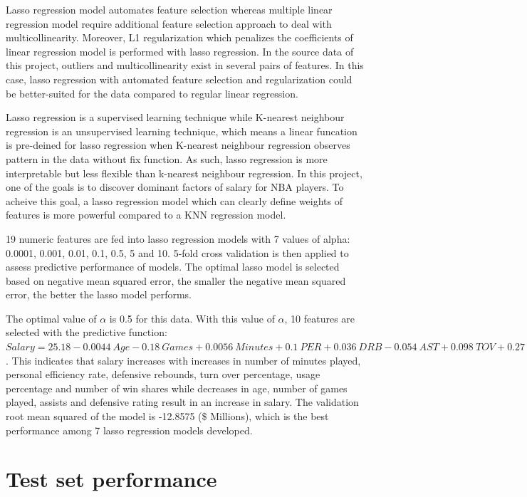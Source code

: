 \documentclass[letterpaper,12pt,twoside,]{pinp}
\begin{document}
Lasso regression model automates feature selection whereas multiple
linear regression model require additional feature selection approach to
deal with multicollinearity. Moreover, L1 regularization which penalizes
the coefficients of linear regression model is performed with lasso
regression. In the source data of this project, outliers and
multicollinearity exist in several pairs of features. In this case,
lasso regression with automated feature selection and regularization
could be better-suited for the data compared to regular linear
regression.

Lasso regression is a supervised learning technique while K-nearest
neighbour regression is an unsupervised learning technique, which means
a linear funcation is pre-deined for lasso regression when K-nearest
neighbour regression observes pattern in the data without fix function.
As such, lasso regression is more interpretable but less flexible than
k-nearest neighbour regression. In this project, one of the goals is to
discover dominant factors of salary for NBA players. To acheive this
goal, a lasso regression model which can clearly define weights of
features is more powerful compared to a KNN regression model.

19 numeric features are fed into lasso regression models with 7 values
of alpha: 0.0001, 0.001, 0.01, 0.1, 0.5, 5 and 10. 5-fold cross
validation is then applied to assess predictive performance of models.
The optimal lasso model is selected based on negative mean squared
error, the smaller the negative mean squared error, the better the lasso
model performs.

The optimal value of \(\alpha\) is 0.5 for this data. With this value of
\(\alpha\), 10 features are selected with the predictive function:
\(Salary = 25.18-0.0044~Age-0.18~Games+0.0056~Minutes+0.1~PER+0.036~DRB-0.054~AST+0.098~TOV+0.27~USG-0.23~RDtg+0.17～WS\).
This indicates that salary increases with increases in number of minutes
played, personal efficiency rate, defensive rebounds, turn over
percentage, usage percentage and number of win shares while decreases in
age, number of games played, assists and defensive rating result in an
increase in salary. The validation root mean squared of the model is
-12.8575 (\$ Millions), which is the best performance among 7 lasso
regression models developed.

\hypertarget{test-set-performance}{%
\section{Test set performance}\label{test-set-performance}}
\end{document}
